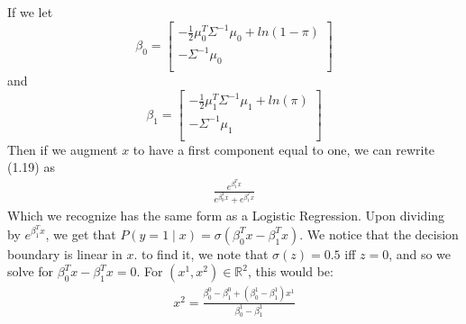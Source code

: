 \documentclass[paper=a4, fontsize=11pt]{scrartcl} %
\numberwithin{equation}{section} %
\numberwithin{figure}{section} %
\numberwithin{table}{section} %
\begin{document}
	If we let
	\begin{equation}
	\beta_0=\begin{bmatrix}
	 -\frac{1}{2}\mu_0^T\Sigma^{-1}\mu_0 + ln(1-\pi)\\
	-\Sigma^{-1}\mu_0 \\
	\end{bmatrix}
	\end{equation}
	and
	\begin{equation}
	\beta_1=\begin{bmatrix}
	-\frac{1}{2}\mu_1^T\Sigma^{-1}\mu_1 + ln(\pi)\\
	-\Sigma^{-1}\mu_1 \\
	\end{bmatrix}
	\end{equation}
	Then if we augment \(x\) to have a first component equal to one, we can rewrite (1.19) as
	\begin{align}
	\frac{e^{\beta_1^Tx}}{e^{\beta_0^Tx}+e^{\beta_1^Tx}}
	\end{align}
	Which we recognize has the same form as a Logistic Regression.
	Upon dividing by \(e^{\beta_1^Tx}\), we get that \(P(y=1 \mid x) = \sigma\left(\beta_0^Tx-\beta_1^Tx\right)\).
	We notice that the decision boundary is linear in \(x\). to find it, we note that \(\sigma(z) = 0.5\) iff \(z = 0\), and so we solve for \(\beta_0^Tx-\beta_1^Tx = 0\). For \((x^1,x^2) \in \mathbb{R}^2\), this would be:
	\begin{align}
	x^2 = \frac{\beta_0^0-\beta_1^{0} + (\beta_0^{1}-\beta_1^{1})x^1}{\beta_0^{1}-\beta_1^{1}}
	\end{align}
	
\end{document}
